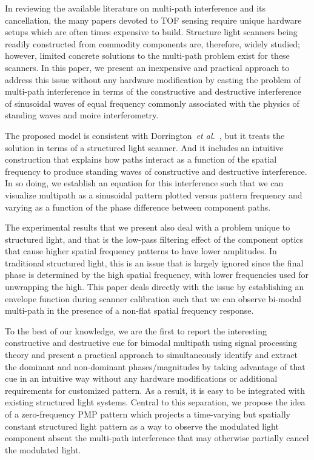 \documentclass[10pt]{article}
\begin{document}
In reviewing the available literature on multi-path interference and its cancellation, the many papers devoted to TOF sensing require unique hardware setups which are often times expensive to build. Structure light scanners being readily constructed from commodity components are, therefore, widely studied; however, limited concrete solutions to the multi-path problem exist for these scanners.  In this paper, we present an inexpensive and practical approach to address this issue without any hardware modification by casting the problem of multi-path interference in terms of the constructive and destructive interference of sinusoidal waves of equal frequency commonly associated with the physics of standing waves and moire interferometry. 

The proposed model is consistent with Dorrington~{\it et al.}~\cite{dorrington2011separating}, but it treats the solution in terms of a structured light scanner.  And it includes an intuitive construction that explains how paths interact as a function of the spatial frequency to produce standing waves of constructive and destructive interference.   In so doing, we establish an equation for this interference such that we can visualize multipath as a sinusoidal pattern plotted versus pattern frequency and varying as a function of the phase difference between component paths.  

The experimental results that we present also deal with a problem unique to structured light, and that is the low-pass filtering effect of the component optics that cause higher spatial frequency patterns to have lower amplitudes.  In traditional structured light, this is an issue that is largely ignored since the final phase is determined by the high spatial frequency, with lower frequencies used for unwrapping the high.  This paper deals directly with the issue by establishing an envelope function during scanner calibration such that we can observe bi-modal multi-path in the presence of a non-flat spatial frequency response. 

To the best of our knowledge, we are the first to report the interesting constructive and destructive cue for bimodal multipath using signal processing theory and present a practical approach to simultaneously identify and extract the dominant and non-dominant phases/magnitudes by taking advantage of that cue in an intuitive way without any hardware modifications or additional requirements for customized pattern. As a result, it is easy to be integrated with existing structured light systems. Central to this separation, we propose the idea of a zero-frequency PMP pattern which projects a time-varying but spatially constant structured light pattern as a way to observe the modulated light component absent the multi-path interference that may otherwise partially cancel the modulated light. 
\end{document}
